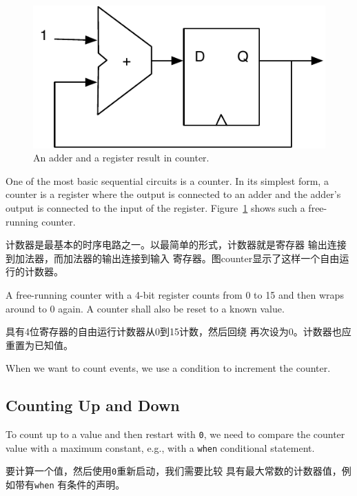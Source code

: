 \documentclass[%
    10pt,
    headinclude, footexclude,
    openright, %
    notitlepage,
    cleardoubleempty,
    headsepline,
    pointlessnumbers,
    bibtotoc, idxtotoc,
    ]{scrbook}
\newcommand{\code}[1]{{\small{\texttt{#1}}}}
\newcommand{\scale}{0.7}
\begin{document}
\begin{figure}
  \centering
  \includegraphics[scale=\scale]{figures/counter}
  \caption{An adder and a register result in counter.}
  \label{fig:counter}
\end{figure}

One of the most basic sequential circuits is a counter. In its simplest form, a counter is a register
where the output is connected to an adder and the adder's output is connected to the input
of the register. Figure~\ref{fig:counter} shows such a free-running counter.

计数器是最基本的时序电路之一。以最简单的形式，计数器就是寄存器
输出连接到加法器，而加法器的输出连接到输入
寄存器。图counter显示了这样一个自由运行的计数器。

A free-running counter with a 4-bit register counts from 0 to 15 and then wraps around
to 0 again. A counter shall also be reset to a known value.

具有4位寄存器的自由运行计数器从0到15计数，然后回绕
再次设为0。计数器也应重置为已知值。


\noindent When we want to count events, we use a condition to  increment the counter.


\subsection{Counting Up and Down}

To count up to a value and then restart with \code{0}, we need to compare
the counter value with a maximum constant, e.g., with a \code{when}
conditional statement.

要计算一个值，然后使用\code{0}重新启动，我们需要比较
具有最大常数的计数器值，例如带有\code{when}
有条件的声明。
\end{document}
